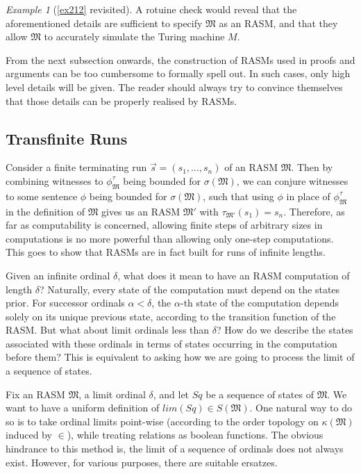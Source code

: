 \documentclass[12pt, twoside]{memoir}
\numberwithin{equation}{section}
\theoremstyle{definition}
\theoremstyle{remark}
\newtheorem{ex}[thm]{Example}
\theoremstyle{definition}
\theoremstyle{definition}
\theoremstyle{definition}
\theoremstyle{remark}
\begin{document}
\begin{ex}[\ref{ex212} revisited]
A rotuine check would reveal that the aforementioned details are sufficient to specify $\mathfrak{M}$ as an RASM, and that they allow $\mathfrak{M}$ to accurately simulate the Turing machine $M$. 
\end{ex}

From the next subsection onwards, the construction of RASMs used in proofs and arguments can be too cumbersome to formally spell out. In such cases, only high level details will be given. The reader should always try to convince themselves that those details can be properly realised by RASMs.

\subsection{Transfinite Runs}

Consider a finite terminating run $\Vec{s} = (s_1, \dots, s_n)$ of an RASM $\mathfrak{M}$. Then by combining witnesses to $\phi^{\tau}_{\mathfrak{M}}$ being bounded for $\sigma(\mathfrak{M})$, we can conjure witnesses to some sentence $\phi$ being bounded for $\sigma(\mathfrak{M})$, such that using $\phi$ in place of $\phi^{\tau}_{\mathfrak{M}}$ in the definition of $\mathfrak{M}$ gives us an RASM $\mathfrak{M}'$ with $\tau_{\mathfrak{M}'}(s_1) = s_n$. Therefore, as far as computability is concerned, allowing finite steps of arbitrary sizes in computations is no more powerful than allowing only one-step computations. This goes to show that
RASMs are in fact built for runs of infinite lengths.

Given an infinite ordinal $\delta$, what does it mean to have an RASM computation of length $\delta$? Naturally, every state of the computation must depend on the states prior. For successor ordinals $\alpha < \delta$, the $\alpha$-th state of the computation depends solely on its unique previous state, according to the transition function of the RASM. But what about limit ordinals less than $\delta$? How do we describe the states associated with these ordinals in terms of states occurring in the computation before them? This is equivalent to asking how we are going to process the limit of a sequence of states.

Fix an RASM $\mathfrak{M}$, a limit ordinal $\delta$, and let $Sq$ be a sequence of states of $\mathfrak{M}$. We want to have a uniform definition of $lim(Sq) \in S(\mathfrak{M})$. One natural way to do so is to take ordinal limits point-wise (according to the order topology on $\kappa(\mathfrak{M})$ induced by $\in$), while treating relations as boolean functions. The obvious hindrance to this method is, the limit of a sequence of ordinals does not always exist. However, for various purposes, there are suitable ersatzes.
\end{document}
